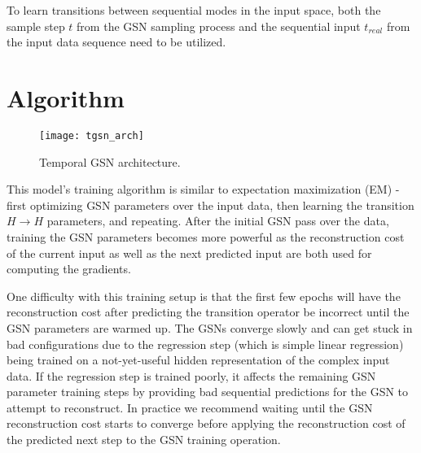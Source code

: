 To learn transitions between sequential modes in the input space, both the sample step \(t\) from the GSN sampling process and the sequential input \(t_{real}\) from the input data sequence need to be utilized.


\section{Algorithm}

\begin{figure}[h!]
  \centering
    \texttt{[image: tgsn\_arch]}
\caption{Temporal GSN architecture.}
\end{figure}

This model's training algorithm is similar to expectation maximization (EM) - first optimizing GSN parameters over the input data, then learning the transition \(H \rightarrow H\) parameters, and repeating. After the initial GSN pass over the data, training the GSN parameters becomes more powerful as the reconstruction cost of the current input as well as the next predicted input are both used for computing the gradients.

One difficulty with this training setup is that the first few epochs will have the reconstruction cost after predicting the transition operator be incorrect until the GSN parameters are warmed up. The GSNs converge slowly and can get stuck in bad configurations due to the regression step (which is simple linear regression) being trained on a not-yet-useful hidden representation of the complex input data. If the regression step is trained poorly, it affects the remaining GSN parameter training steps by providing bad sequential predictions for the GSN to attempt to reconstruct. In practice we recommend waiting until the GSN reconstruction cost starts to converge before applying the reconstruction cost of the predicted next step to the GSN training operation.

